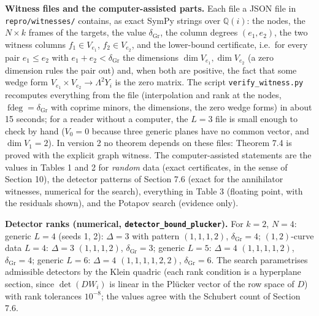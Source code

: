 \documentclass[
  11pt,
  a4paper,
]{article}
\begin{document}
\textbf{Witness files and the computer-assisted parts.} Each file a JSON
file in {\small\texttt{repro/\allowbreak{}witnesses/\allowbreak{}}} contains, as exact SymPy strings over
\(\mathbb Q(i)\): the nodes, the \(N\times k\) frames of the targets,
the value \(\delta_{\mathrm{Gr}}\), the column degrees \((e_1,\allowbreak{}e_2)\),
the two witness columns \(f_1\in V_{e_1}\), \(f_2\in V_{e_2}\), and the
lower-bound certificate, i.e.~for every pair \(e_1\le e_2\) with
\(e_1+e_2<\delta_{\mathrm{Gr}}\) the dimensions
\(\dim V_{e_1},\allowbreak{}\dim V_{e_2}\) (a zero dimension rules the pair out) and,
when both are positive, the fact that some wedge form
\(V_{e_1}\times V_{e_2}\to\Lambda^2Y_i\) is the zero matrix. The script
{\small\texttt{verify\_\allowbreak{}witness.\allowbreak{}py}} recomputes everything from the file
(interpolation and rank at the nodes,
\(\operatorname{fdeg}=\delta_{\mathrm{Gr}}\) with coprime minors, the
dimensions, the zero wedge forms) in about 15 seconds; for a reader
without a computer, the \(L=3\) file is small enough to check by hand
(\(V_0=0\) because three generic planes have no common vector, and
\(\dim V_1=2\)). In version 2 no theorem depends on these files: Theorem
7.4 is proved with the explicit graph witness. The computer-assisted
statements are the values in Tables 1 and 2 for \emph{random} data
(exact certificates, in the sense of Section 10), the detector patterns
of Section 7.6 (exact for the annihilator witnesses, numerical for the
search), everything in Table 3 (floating point, with the residuals
shown), and the Potapov search (evidence only).

\textbf{Detector ranks (numerical, {\small\texttt{detector\_\allowbreak{}bound\_\allowbreak{}plucker}}).}
For \(k=2\), \(N=4\): generic \(L=4\) (seeds 1, 2): \(\Delta=3\) with
pattern \((1,\allowbreak{}1,\allowbreak{}1,\allowbreak{}2)\), \(\delta_{\mathrm{Gr}}=4\); \((1,\allowbreak{}2)\)-curve data
\(L=4\): \(\Delta=3\) \((1,\allowbreak{}1,\allowbreak{}1,\allowbreak{}2)\), \(\delta_{\mathrm{Gr}}=3\); generic
\(L=5\): \(\Delta=4\) \((1,\allowbreak{}1,\allowbreak{}1,\allowbreak{}1,\allowbreak{}2)\), \(\delta_{\mathrm{Gr}}=4\);
generic \(L=6\): \(\Delta=4\) \((1,\allowbreak{}1,\allowbreak{}1,\allowbreak{}1,\allowbreak{}2,\allowbreak{}2)\),
\(\delta_{\mathrm{Gr}}=6\). The search parametrises admissible detectors
by the Klein quadric (each rank condition is a hyperplane section, since
\(\det(DW_i)\) is linear in the Plücker vector of the row space of
\(D\)) with rank tolerances \(10^{-8}\); the values agree with the
Schubert count of Section 7.6.
\end{document}
